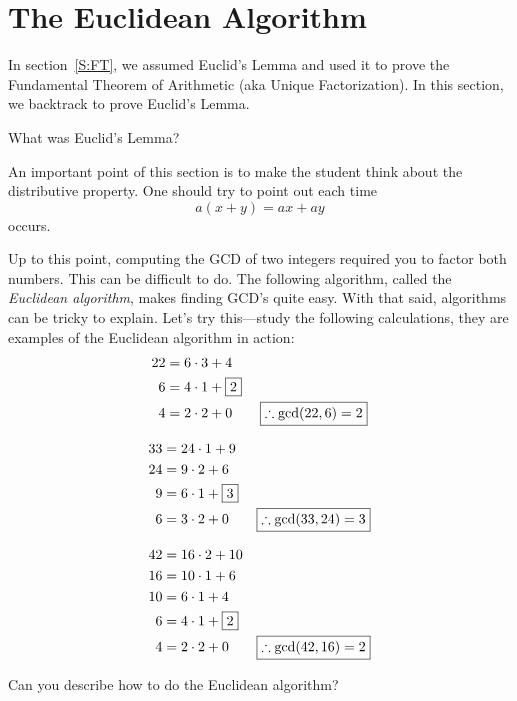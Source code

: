 \section{The Euclidean Algorithm}\label{S:EA}
In section~\ref{S:FT}, we assumed Euclid's Lemma and used it to prove the Fundamental 
Theorem of Arithmetic (aka Unique Factorization).  In this section, we backtrack 
to prove Euclid's Lemma.  

\begin{question}
What was Euclid's Lemma?
\end{question}
\QM

\begin{teachingnote}
An important point of this section is to make the student think about
the distributive property. One should try to point out each time
\[
a(x+y) = ax + ay
\]
occurs.
\end{teachingnote}

Up to this point, computing the GCD of two integers required you to
factor both numbers.  This can be difficult to do. The following
algorithm, called the \textit{Euclidean algorithm}, makes finding
GCD's quite easy. With that said, algorithms can be tricky to
explain. Let's try this---study the following calculations, they are
examples of the Euclidean algorithm in action:
\begin{align*}
22 &= 6\cdot 3 + 4\\ 
6 &= 4\cdot 1 + \fbox{$2$}\\ 4 &= 2 \cdot 2 + 0 \qquad 
\fbox{$\therefore \gcd(22,6) = 2$}
\end{align*}

\begin{align*}
33 &= 24\cdot 1 + 9\\
24 &= 9 \cdot 2 + 6\\
9 &= 6 \cdot 1 + \fbox{$3$}\\
6 &= 3 \cdot 2 + 0 \qquad \fbox{$\therefore \gcd(33,24) = 3$} 
\end{align*}

\begin{align*}
42 &= 16\cdot 2 + 10\\
16 &= 10 \cdot 1 + 6\\
10 &= 6 \cdot 1 + 4\\
6 &= 4 \cdot 1 + \fbox{$2$}\\
4 &= 2 \cdot 2 + 0 \qquad \fbox{$\therefore \gcd(42,16) = 2$} 
\end{align*}

\begin{question}
Can you describe how to do the Euclidean algorithm?
\end{question}
\QM

